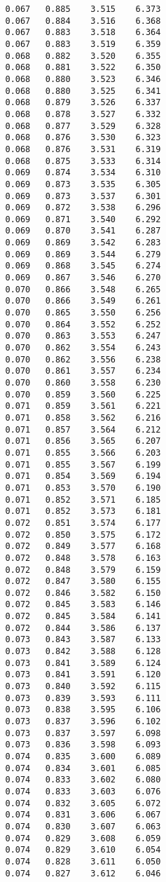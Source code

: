 \begin{verbatim}
   0.067   0.885    3.515    6.373
   0.067   0.884    3.516    6.368
   0.067   0.883    3.518    6.364
   0.067   0.883    3.519    6.359
   0.068   0.882    3.520    6.355
   0.068   0.881    3.522    6.350
   0.068   0.880    3.523    6.346
   0.068   0.880    3.525    6.341
   0.068   0.879    3.526    6.337
   0.068   0.878    3.527    6.332
   0.068   0.877    3.529    6.328
   0.068   0.876    3.530    6.323
   0.068   0.876    3.531    6.319
   0.068   0.875    3.533    6.314
   0.069   0.874    3.534    6.310
   0.069   0.873    3.535    6.305
   0.069   0.873    3.537    6.301
   0.069   0.872    3.538    6.296
   0.069   0.871    3.540    6.292
   0.069   0.870    3.541    6.287
   0.069   0.869    3.542    6.283
   0.069   0.869    3.544    6.279
   0.069   0.868    3.545    6.274
   0.069   0.867    3.546    6.270
   0.070   0.866    3.548    6.265
   0.070   0.866    3.549    6.261
   0.070   0.865    3.550    6.256
   0.070   0.864    3.552    6.252
   0.070   0.863    3.553    6.247
   0.070   0.862    3.554    6.243
   0.070   0.862    3.556    6.238
   0.070   0.861    3.557    6.234
   0.070   0.860    3.558    6.230
   0.070   0.859    3.560    6.225
   0.071   0.859    3.561    6.221
   0.071   0.858    3.562    6.216
   0.071   0.857    3.564    6.212
   0.071   0.856    3.565    6.207
   0.071   0.855    3.566    6.203
   0.071   0.855    3.567    6.199
   0.071   0.854    3.569    6.194
   0.071   0.853    3.570    6.190
   0.071   0.852    3.571    6.185
   0.071   0.852    3.573    6.181
   0.072   0.851    3.574    6.177
   0.072   0.850    3.575    6.172
   0.072   0.849    3.577    6.168
   0.072   0.848    3.578    6.163
   0.072   0.848    3.579    6.159
   0.072   0.847    3.580    6.155
   0.072   0.846    3.582    6.150
   0.072   0.845    3.583    6.146
   0.072   0.845    3.584    6.141
   0.072   0.844    3.586    6.137
   0.073   0.843    3.587    6.133
   0.073   0.842    3.588    6.128
   0.073   0.841    3.589    6.124
   0.073   0.841    3.591    6.120
   0.073   0.840    3.592    6.115
   0.073   0.839    3.593    6.111
   0.073   0.838    3.595    6.106
   0.073   0.837    3.596    6.102
   0.073   0.837    3.597    6.098
   0.073   0.836    3.598    6.093
   0.074   0.835    3.600    6.089
   0.074   0.834    3.601    6.085
   0.074   0.833    3.602    6.080
   0.074   0.833    3.603    6.076
   0.074   0.832    3.605    6.072
   0.074   0.831    3.606    6.067
   0.074   0.830    3.607    6.063
   0.074   0.829    3.608    6.059
   0.074   0.829    3.610    6.054
   0.074   0.828    3.611    6.050
   0.074   0.827    3.612    6.046

\end{verbatim}
